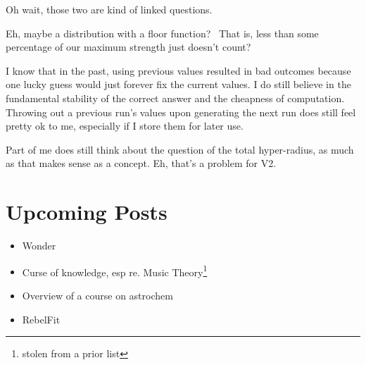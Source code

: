 \documentclass[12pt]{article}
\renewcommand{\,}{\textsuperscript{,}}
\begin{document}
Oh wait, those two are kind of linked questions.

Eh, maybe a distribution with a floor function?   
That is, less than some percentage of our maximum strength just doesn't count?

I know that in the past, using previous values resulted in bad outcomes because one lucky guess would just forever fix the current values.  
I do still believe in the fundamental stability of the correct answer and the cheapness of computation.  
Throwing out a previous run's values upon generating the next run does still feel pretty ok to me, especially if I store them for later use.

Part of me does still think about the question of the total hyper-radius, as much as that makes sense as a concept.  
Eh, that's a problem for V2.

\section{Upcoming Posts}  
\begin{itemize}

\item Wonder  
\item Curse of knowledge, esp re. Music Theory\footnote{stolen from a prior list}  
\item Overview of a course on astrochem  
\item RebelFit

\end{itemize}
\end{document}
